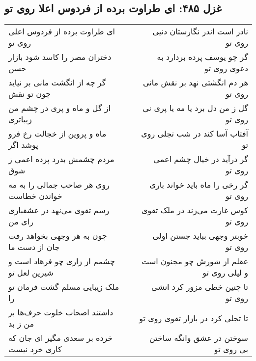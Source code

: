 \begin{center}
\section*{غزل ۴۸۵: ای طراوت برده از فردوس اعلا روی تو}
\label{sec:485}
\begin{longtable}{l p{0.5cm} r}
ای طراوت برده از فردوس اعلی روی تو
&&
نادر است اندر نگارستان دنیی روی تو
\\
دختران مصر را کاسد شود بازار حسن
&&
گر چو یوسف پرده بردارد به دعوی روی تو
\\
گر چه از انگشت مانی بر نیاید چون تو نقش
&&
هر دم انگشتی نهد بر نقش مانی روی تو
\\
از گل و ماه و پری در چشم من زیباتری
&&
گل ز من دل برد یا مه یا پری نی روی تو
\\
ماه و پروین از خجالت رخ فرو پوشد اگر
&&
آفتاب آسا کند در شب تجلی روی تو
\\
مردم چشمش بدرد پرده اعمی ز شوق
&&
گر درآید در خیال چشم اعمی روی تو
\\
روی هر صاحب جمالی را به مه خواندن خطاست
&&
گر رخی را ماه باید خواند باری روی تو
\\
رسم تقوی می‌نهد در عشقبازی رای من
&&
کوس غارت می‌زند در ملک تقوی روی تو
\\
چون به هر وجهی بخواهد رفت جان از دست ما
&&
خوبتر وجهی بباید جستن اولی روی تو
\\
چشمم از زاری چو فرهاد است و شیرین لعل تو
&&
عقلم از شورش چو مجنون است و لیلی روی تو
\\
ملک زیبایی مسلم گشت فرمان تو را
&&
تا چنین خطی مزور کرد انشی روی تو
\\
داشتند اصحاب خلوت حرف‌ها بر من ز بد
&&
تا تجلی کرد در بازار تقوی روی تو
\\
خرده بر سعدی مگیر ای جان که کاری خرد نیست
&&
سوختن در عشق وانگه ساختن بی روی تو
\\
\end{longtable}
\end{center}
